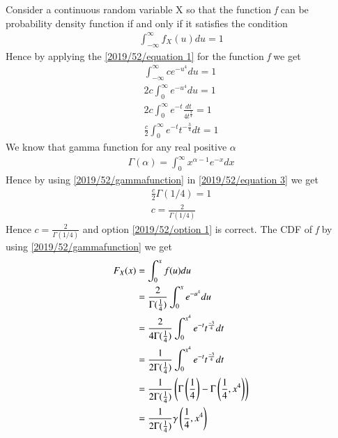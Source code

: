 Consider a continuous random variable X so that the function \textit{f} can be probability density function if and only if it satisfies the condition 
\begin{align}
    \int_{-\infty}^{\infty}f_{X}(u)du = 1 \label{2019/52/equation 1}
\end{align}
Hence by applying the \eqref{2019/52/equation 1} for the function \textit{f} we get
\begin{align}
    \int_{-\infty}^{\infty}ce^{-u^{4}}du = 1\\
    2c\int_{0}^{\infty}e^{-u^{4}}du = 1\label{2019/52/equation 2}\\
    2c\int_{0}^{\infty}e^{-t}\frac{dt}{4t^{\frac{3}{4}}} = 1\\
    \frac{c}{2}\int_{0}^{\infty}e^{-t}t^{-\frac{3}{4}}dt = 1\label{2019/52/equation 3}
\end{align}
We know that gamma function for any real positive $\alpha$
\begin{align}
    \Gamma(\alpha) = \int_0^\infty x^{\alpha - 1} e^{-x} dx \label{2019/52/gammafunction}
\end{align}
Hence by using \eqref{2019/52/gammafunction} in \eqref{2019/52/equation 3} we get
\begin{align}
    \frac{c}{2}\Gamma(1/4) = 1\\
    c=\frac{2}{\Gamma(1/4)}
\end{align}
Hence $c = \displaystyle\frac{2}{\Gamma(1/4)}$ and option \eqref{2019/52/option 1} is correct.\newline\newline
The CDF of \textit{f} by using \eqref{2019/52/gammafunction} we get
\begin{align}
    F_{X}(x) &= \int_{0}^{x}f(u)du\\
             &= \frac{2}{\Gamma(\frac{1}{4})}\int_{0}^{x}e^{-u^{4}}du\\
             &= \frac{2}{4\Gamma(\frac{1}{4})}\int_{0}^{x^{4}}e^{-t}{t^{\frac{-3}{4}}}dt\\
             &= \frac{1}{2\Gamma(\frac{1}{4})}\int_{0}^{x^{4}}e^{-t}{t^{\frac{-3}{4}}}dt\\
             &= \frac{1}{2\Gamma(\frac{1}{4})}\left(\Gamma\left(\frac{1}{4}\right)-\Gamma\left(\frac{1}{4},x^{4}\right)\right)\\
             &= \frac{1}{2\Gamma(\frac{1}{4})}\gamma\left(\frac{1}{4},x^{4}\right)
\end{align}